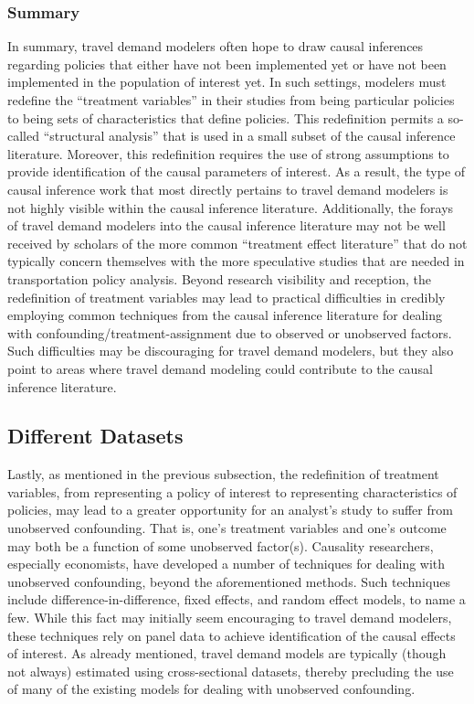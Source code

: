 \subsubsection{Summary}
In summary, travel demand modelers often hope to draw causal inferences regarding policies that either have not been implemented yet or have not been implemented in the population of interest yet. In such settings, modelers must redefine the ``treatment variables'' in their studies from being particular policies to being sets of characteristics that define policies. This redefinition permits a so-called ``structural analysis'' that is used in a small subset of the causal inference literature. Moreover, this redefinition requires the use of strong assumptions to provide identification of the causal parameters of interest. As a result, the type of causal inference work that most directly pertains to travel demand modelers is not highly visible within the causal inference literature. Additionally, the forays of travel demand modelers into the causal inference literature may not be well received by scholars of the more common ``treatment effect literature'' that do not typically concern themselves with the more speculative studies that are needed in transportation policy analysis. Beyond research visibility and reception, the redefinition of treatment variables may lead to practical difficulties in credibly employing common techniques from the causal inference literature for dealing with confounding/treatment-assignment due to observed or unobserved factors. Such difficulties may be discouraging for travel demand modelers, but they also point to areas where travel demand modeling could contribute to the causal inference literature.

\subsection{Different Datasets}
\label{sec:diff_datasets}
Lastly, as mentioned in the previous subsection, the redefinition of treatment variables, from representing a policy of interest to representing characteristics of policies, may lead to a greater opportunity for an analyst's study to suffer from unobserved confounding. That is, one's treatment variables and one's outcome may both be a function of some unobserved factor(s). Causality researchers, especially economists, have developed a number of techniques for dealing with unobserved confounding, beyond the aforementioned methods. Such techniques include difference-in-difference, fixed effects, and random effect models, to name a few. While this fact may initially seem encouraging to travel demand modelers, these techniques rely on panel data to achieve identification of the causal effects of interest. As already mentioned, travel demand models are typically (though not always) estimated using cross-sectional datasets, thereby precluding the use of many of the existing models for dealing with unobserved confounding.

